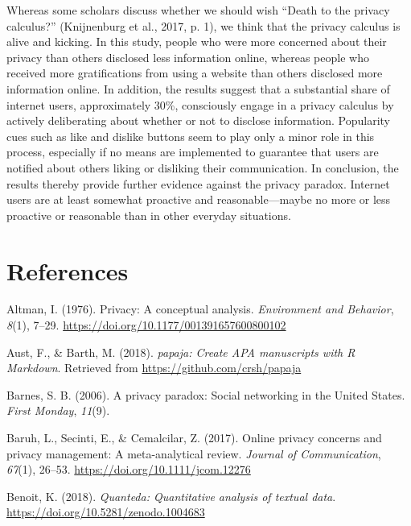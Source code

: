 \documentclass[
  english,
  man,floatsintext]{apa6}
\begin{document}
Whereas some scholars discuss whether we should wish \enquote{Death to the privacy calculus?} (Knijnenburg et al., 2017, p. 1), we think that the privacy calculus is alive and kicking.
In this study, people who were more concerned about their privacy than others disclosed less information online, whereas people who received more gratifications from using a website than others disclosed more information online.
In addition, the results suggest that a substantial share of internet users, approximately 30\%, consciously engage in a privacy calculus by actively deliberating about whether or not to disclose information.
Popularity cues such as like and dislike buttons seem to play only a minor role in this process, especially if no means are implemented to guarantee that users are notified about others liking or disliking their communication.
In conclusion, the results thereby provide further evidence against the privacy paradox.
Internet users are at least somewhat proactive and reasonable---maybe no more or less proactive or reasonable than in other everyday situations.

\newpage

\hypertarget{references}{%
\section{References}\label{references}}

\setlength{\parindent}{-0.5in}
\setlength{\leftskip}{0.5in}

\hypertarget{refs}{}
\leavevmode\hypertarget{ref-altmanPrivacyConceptualAnalysis1976}{}%
Altman, I. (1976). Privacy: A conceptual analysis. \emph{Environment and Behavior}, \emph{8}(1), 7--29. \url{https://doi.org/10.1177/001391657600800102}

\leavevmode\hypertarget{ref-R-papaja}{}%
Aust, F., \& Barth, M. (2018). \emph{papaja: Create APA manuscripts with R Markdown}. Retrieved from \url{https://github.com/crsh/papaja}

\leavevmode\hypertarget{ref-barnesPrivacyParadoxSocial2006}{}%
Barnes, S. B. (2006). A privacy paradox: Social networking in the United States. \emph{First Monday}, \emph{11}(9).

\leavevmode\hypertarget{ref-baruhOnlinePrivacyConcerns2017}{}%
Baruh, L., Secinti, E., \& Cemalcilar, Z. (2017). Online privacy concerns and privacy management: A meta-analytical review. \emph{Journal of Communication}, \emph{67}(1), 26--53. \url{https://doi.org/10.1111/jcom.12276}

\leavevmode\hypertarget{ref-R-quanteda}{}%
Benoit, K. (2018). \emph{Quanteda: Quantitative analysis of textual data}. \url{https://doi.org/10.5281/zenodo.1004683}
\end{document}
